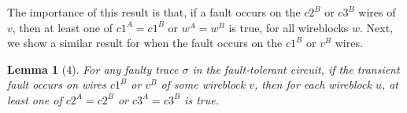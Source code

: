 \documentclass[12pt]{report}
\newtheorem*{lemma}{Lemma}
\begin{document}
The importance of this result is that, if a fault occurs on the $c2^B$ or $c3^B$ wires of $v$, then at least one of $c1^A=c1^B$ or $w^A=w^B$ is true, for all wireblocks $w$.  Next, we show a similar result for when the fault occurs on the $c1^B$ or $v^B$ wires. 



\begin{lemma}[4]
For any faulty trace $\sigma$ in the fault-tolerant circuit, if the transient fault occurs on wires $c1^B$ or $v^B$ of some wireblock $v$, then for each wireblock $u$, at least one of $c2^A=c2^B$ or $c3^A=c3^B$ is true.\end{lemma}
\end{document}
